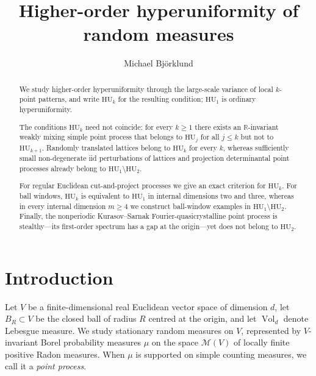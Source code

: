 \documentclass[11pt,reqno,a4paper]{amsart}
\numberwithin{equation}{section}
\theoremstyle{compact}
\theoremstyle{definition}
\theoremstyle{definition}
\newcommand{\HU}{\mathrm{HU}}
\newcommand{\Vol}{\operatorname{Vol}}
\newcommand{\cM}{\mathcal M}
\begin{document}
\title{Higher-order hyperuniformity of random measures}

\author{Michael Bj\"orklund}
\address{Department of Mathematics, Chalmers University of Technology and University of Gothenburg, Gothenburg, Sweden}


\begin{abstract}
We study higher-order hyperuniformity through the large-scale variance of
local $k$-point patterns, and write $\HU_k$ for the resulting condition;
$\HU_1$ is ordinary hyperuniformity.

The conditions $\HU_k$ need not coincide: for every $k\geq1$ there exists an
$\mathbb R$-invariant weakly mixing simple point process that belongs to
$\HU_j$ for all $j\leq k$ but not to $\HU_{k+1}$.  Randomly translated
lattices belong to $\HU_k$ for every $k$, whereas sufficiently small
non-degenerate iid perturbations of lattices and projection determinantal
point processes already belong to $\HU_1\setminus\HU_2$.

For regular Euclidean cut-and-project processes we give an exact criterion
for $\HU_k$.  For ball windows, $\HU_k$ is equivalent to $\HU_1$ in internal
dimensions two and three, whereas in every internal dimension $m\geq4$ we
construct ball-window examples in $\HU_1\setminus\HU_2$.  Finally, the nonperiodic Kurasov--Sarnak Fourier-quasicrystalline point process
is stealthy---its first-order spectrum has a gap at the origin---yet does not
belong to $\HU_2$.
\end{abstract}

\maketitle

\section{Introduction}
\label{sec:introduction}

Let $V$ be a finite-dimensional real Euclidean vector space of dimension
$d$, let $B_R\subset V$ be the closed ball of radius $R$ centred at the
origin, and let $\Vol_d$ denote Lebesgue measure.  We study stationary random
measures on $V$, represented by $V$-invariant Borel probability measures
$\mu$ on the space $\cM(V)$ of locally finite positive Radon measures.  When
$\mu$ is supported on simple counting measures, we call it a \emph{point
process}.
\end{document}

